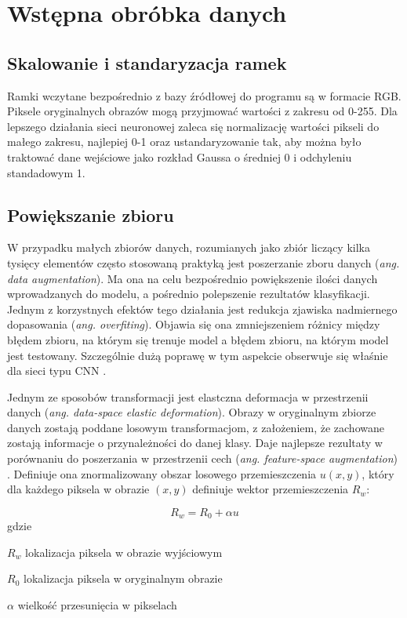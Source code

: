 \section{Wstępna obróbka danych}
\subsection{Skalowanie i standaryzacja ramek}
Ramki wczytane bezpośrednio z bazy źródłowej do programu są w formacie RGB. Piksele oryginalnych obrazów mogą przyjmować wartości z zakresu od 0-255. Dla lepszego działania sieci neuronowej zaleca się normalizację wartości pikseli do małego zakresu, najlepiej 0-1 oraz ustandaryzowanie tak, aby można było traktować dane wejściowe jako rozkład Gaussa o średniej 0 i odchyleniu standadowym 1.

\subsection{Powiększanie zbioru}
W przypadku małych zbiorów danych, rozumianych jako zbiór liczący kilka tysięcy elementów często stosowaną praktyką jest poszerzanie zboru danych (\textit{ang. data augmentation}). Ma ona na celu bezpośrednio powiększenie ilości danych wprowadzanych do modelu, a pośrednio polepszenie rezultatów klasyfikacji. Jednym z korzystnych efektów tego działania jest redukcja zjawiska nadmiernego dopasowania (\textit{ang. overfiting}). Objawia się ona zmniejszeniem różnicy między błędem zbioru, na którym się trenuje model a błędem zbioru, na którym model jest testowany. Szczególnie dużą poprawę w tym aspekcie obserwuje się właśnie dla sieci typu CNN \cite{Wong2016UnderstandingDA}.

Jednym ze sposobów transformacji jest elastczna deformacja w przestrzenii danych (\textit{ang. data-space elastic deformation}). Obrazy w oryginalnym zbiorze danych zostają poddane losowym transformacjom, z założeniem, że zachowane zostają informacje o przynależności do danej klasy. Daje najlepsze rezultaty w porównaniu do poszerzania w przestrzenii cech (\textit{ang. feature-space augmentation}) \cite{augmentation}. Definiuje ona znormalizowany obszar losowego przemieszczenia \(u(x,y)\), który dla każdego piksela w obrazie \((x,y)\) definiuje wektor przemieszczenia \(R_w\):

\begin{equation}
R_w = R_0 + \alpha u
\end{equation}
gdzie
\begin{eqwhere}[2cm]
	\item[$R_w$] lokalizacja piksela w obrazie wyjściowym
	\item[$R_0$] lokalizacja piksela w oryginalnym obrazie
	\item[$\alpha$] wielkość przesunięcia w pikselach
\end{eqwhere}

